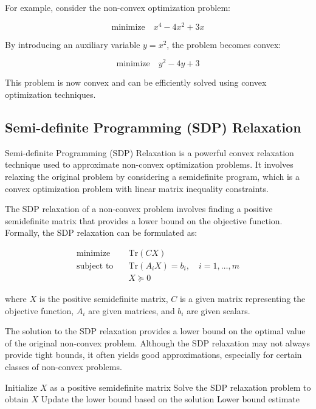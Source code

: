 \documentclass[12pt]{book} %
\begin{document}
For example, consider the non-convex optimization problem:

\[
\text{minimize} \quad x^4 - 4x^2 + 3x
\]

By introducing an auxiliary variable \(y = x^2\), the problem becomes convex:

\[
\text{minimize} \quad y^2 - 4y + 3
\]

This problem is now convex and can be efficiently solved using convex optimization techniques.

\subsection{Semi-definite Programming (SDP) Relaxation}

Semi-definite Programming (SDP) Relaxation is a powerful convex relaxation technique used to approximate non-convex optimization problems. It involves relaxing the original problem by considering a semidefinite program, which is a convex optimization problem with linear matrix inequality constraints.

The SDP relaxation of a non-convex problem involves finding a positive semidefinite matrix that provides a lower bound on the objective function. Formally, the SDP relaxation can be formulated as:

\begin{align*}
\text{minimize} \quad & \text{Tr}(CX) \\
\text{subject to} \quad & \text{Tr}(A_iX) = b_i, \quad i = 1, \ldots, m \\
& X \succeq 0
\end{align*}

where \(X\) is the positive semidefinite matrix, \(C\) is a given matrix representing the objective function, \(A_i\) are given matrices, and \(b_i\) are given scalars.

The solution to the SDP relaxation provides a lower bound on the optimal value of the original non-convex problem. Although the SDP relaxation may not always provide tight bounds, it often yields good approximations, especially for certain classes of non-convex problems.
\FloatBarrier
\begin{algorithm}[H]
\caption{SDP Relaxation Algorithm}
\begin{algorithmic}[1]
\State Initialize \(X\) as a positive semidefinite matrix
\Repeat
\State Solve the SDP relaxation problem to obtain \(X\)
\State Update the lower bound based on the solution
\Return Lower bound estimate
\end{algorithmic}
\end{algorithm}
\FloatBarrier
\end{document}
